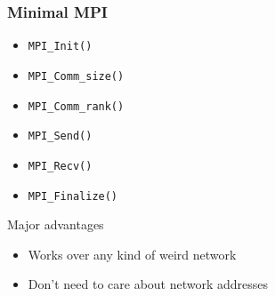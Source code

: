 \documentclass[xcolor={x11names,svgnames,psnames}]{beamer}
\begin{document}
\begin{frame}
  \frametitle{Minimal MPI}

  \begin{itemize}
  \item \texttt{MPI_Init()}
  \item \texttt{MPI_Comm_size()}
  \item \texttt{MPI_Comm_rank()}
  \item \texttt{MPI_Send()}
  \item \texttt{MPI_Recv()}    
  \item \texttt{MPI_Finalize()}
  \end{itemize}

  \begin{alertblock}{Major advantages}
    \begin{itemize}
    \item Works over any kind of weird network
    \item Don't need to care about network addresses
    \end{itemize}
  \end{alertblock}
\end{frame}

\end{document}
